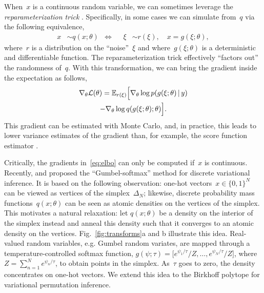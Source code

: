 \documentclass[twoside]{article}
\begin{document}
When~$x$ is a continuous random variable, we can sometimes leverage the \emph{reparameterization trick}
\citep{Salimans2013, Kingma2014}.  Specifically, in some cases we can
simulate from~$q$ via the following equivalence,
\begin{align*}
  x &\sim q(x; \theta)
      & \iff & &  
  \xi &\sim r(\xi), \quad x = g(\xi;\theta),
\end{align*}
where~$r$ is a distribution on the ``noise''~$\xi$ and
where~$g(\xi; \theta)$ is a deterministic and differentiable
function.
The reparameterization trick effectively ``factors out'' the randomness
of~$q$. With this transformation, we can bring the gradient inside the
expectation as follows,
\begin{multline}
  \label{eq:elbo}
  \nabla_\theta \mathcal{L}(\theta) 
  = \mathbb{E}_{r(\xi)} \Big[ \nabla_\theta \log p(g(\xi; \theta) \, | \, y) \\
    - \nabla_\theta  \log q(g(\xi; \theta); \theta) \Big].
\end{multline}
This gradient can be estimated with Monte Carlo, and, in practice,
this leads to lower variance estimates of the gradient than, for
example, the score function estimator \citep{Williams1992, Glynn1990}.

Critically, the gradients in~\eqref{eq:elbo} can only be computed
if~$x$ is continuous. Recently, \citet{maddison2016concrete} and
\citet{jang2016categorical} proposed the ``Gumbel-softmax'' method for
discrete variational inference. It is based on the following
observation: one-hot vectors~${x \in \{0,1\}^N}$ can be
viewed as vertices of the simplex~$\Delta_N$; likewise, discrete
probability mass functions~$q(x; \theta)$ can be seen as atomic
densities on the vertices of the simplex.  This motivates a natural
relaxation: let $q(x; \theta)$ be a density on the interior of the
simplex instead and anneal this density such that it converges to an
atomic density on the vertices. Fig.~\ref{fig:transforms}a and b
illustrate this idea. Real-valued random variables, e.g. Gumbel random
variates, are mapped through a temperature-controlled softmax
function,
${g(\psi; \tau) = \big[e^{\psi_1 / \tau}/Z, \ldots, e^{\psi_N /
    \tau}/Z \big]}$, where~$Z=\sum_{n=1}^N e^{\psi_n / \tau}$, to
obtain points in the simplex. As~$\tau$ goes to zero, the density
concentrates on one-hot vectors.  We extend this idea to the Birkhoff
polytope for variational permutation inference.
\end{document}
